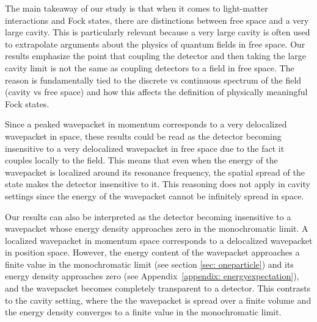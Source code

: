 \documentclass[prd,twocolumn,superscriptaddress,nofootinbib,floatfix,amsmath,amssymb]{revtex4-2}
\begin{document}
    
    
    
    
    The main takeaway of our study is that when it comes to light-matter interactions and Fock states, there are distinctions between  free space and a very large cavity. This is particularly relevant because a very large cavity is often used to extrapolate arguments about the physics of quantum fields in free space. Our results emphasize the point that coupling the detector and then taking the large cavity limit is not the same as coupling detectors to a field in free space. The reason is fundamentally tied to the discrete vs continuous spectrum of the field (cavity vs free space) and how this affects the definition of physically meaningful Fock states.
    
    {Since a peaked wavepacket in momentum corresponds to a very delocalized wavepacket in space, these results could be read as the detector becoming insensitive to a very delocalized wavepacket in free space due to the fact it couples locally to the field. This means that even when the energy of the wavepacket is localized around its resonance frequency, the spatial spread of the state makes the detector insensitive to it. This reasoning does not apply in cavity settings since the energy of the wavepacket cannot be infinitely spread in space.}
    
   {Our results can also be interpreted as the detector becoming insensitive to a wavepacket whose energy density approaches zero in the monochromatic limit. A localized wavepacket in momentum space corresponds to a delocalized wavepacket in position space. However, the energy content of the wavepacket approaches a finite value in the monochromatic limit (see section \ref{sec: oneparticle}) and its energy density approaches zero (see Appendix~\ref{appendix: energyexpectation}), and the wavepacket becomes completely transparent to a detector. This contrasts to the cavity setting, where the the wavepacket is spread over a finite volume and the energy density converges to a finite value in the monochromatic limit.}
    
\end{document}
